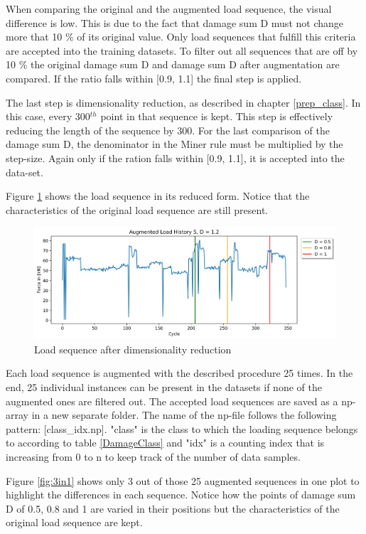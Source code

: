 When comparing the original and the augmented load sequence, the visual difference is low. This is due to the fact that damage sum D must not change more that 10 \% of its original value. Only load sequences  that fulfill this criteria are accepted into the training datasets.
To filter out all sequences that are off by 10 \% the original damage sum D and damage sum D after augmentation are compared.
If the ratio falls within [0.9, 1.1] the final step is applied.


The last step is dimensionality reduction, as described in chapter \ref{prep_class}. In this case, every 300\(^{th}\) point in that sequence is kept. This step is effectively reducing the length of the sequence by 300. For the last comparison of the damage sum D, the denominator in the Miner rule must be multiplied by the step-size. Again only if the ration falls within [0.9, 1.1], it is accepted into the data-set. 

Figure \ref{fig:Verlauf_5_reduced} shows the load sequence in its reduced form. Notice that the characteristics of the original load sequence are still present.
 
\begin{figure}[H]
	\centering
	\includegraphics[width=1\linewidth]{IMGs/Verlauf_5_reduced.jpg}
	\caption{Load sequence after dimensionality reduction}
	\label{fig:Verlauf_5_reduced}
\end{figure}

Each load sequence is augmented with the described procedure 25 times. In the end, 25 individual instances can be present in the datasets if none of the augmented ones are filtered out. 
The accepted load sequences are saved as a np-array in a new separate folder. The name of the np-file follows the following pattern: [class\_idx.np]. "class" is the class to which the loading sequence belongs to according to table \ref{DamageClass} and "idx" is a counting index that is increasing from 0 to n to keep track of the number of data samples.

Figure \ref{fig:3in1} shows only 3 out of those 25 augmented sequences in one plot to highlight the differences in each sequence.
Notice how the points of damage sum D of 0.5, 0.8 and 1 are varied in their positions but the characteristics of the original load sequence are kept.

